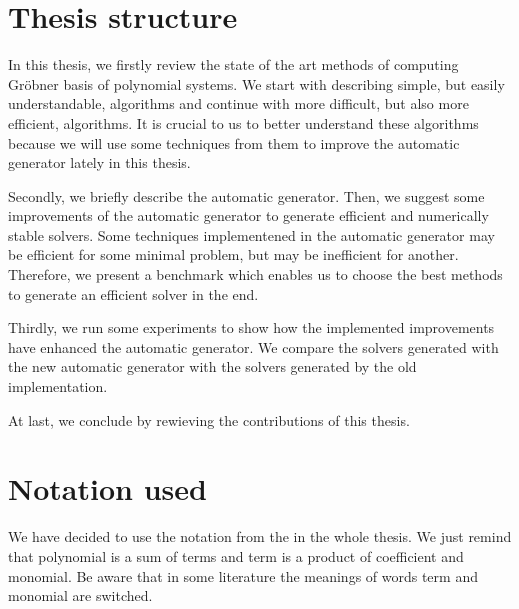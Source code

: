 \section{Thesis structure}
In this thesis, we firstly review the state of the art methods of computing Gr\"obner basis of polynomial systems. We start with describing simple, but easily understandable, algorithms and continue with more difficult, but also more efficient, algorithms. It is crucial to us to better understand these algorithms because we will use some techniques from them to improve the automatic generator lately in this thesis.

Secondly, we briefly describe the automatic generator. Then, we suggest some improvements of the automatic generator to generate efficient and numerically stable solvers. Some techniques implementened in the automatic generator may be efficient for some minimal problem, but may be inefficient for another. Therefore, we present a benchmark which enables us to choose the best methods to generate an efficient solver in the end.

Thirdly, we run some experiments to show how the implemented improvements have enhanced the automatic generator. We compare the solvers generated with the new automatic generator with the solvers generated by the old implementation.

At last, we conclude by rewieving the contributions of this thesis.

\section{Notation used}
We have decided to use the notation from the \cite{Cox-Little-Shea97} in the whole thesis. We just remind that polynomial is a sum of terms and term is a product of coefficient and monomial. Be aware that in some literature \cite{Becker93, F4, F5} the meanings of words term and monomial are switched.
